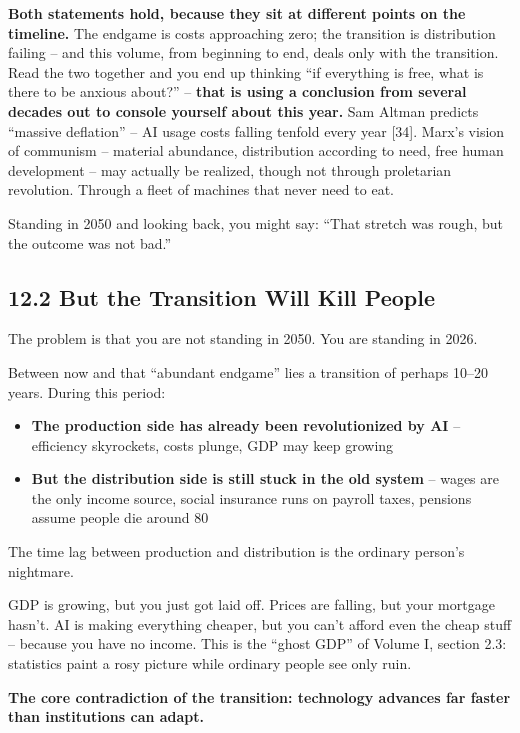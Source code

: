 \documentclass[11pt,a4paper]{article}
\begin{document}
\textbf{Both statements hold, because they sit at different points on the timeline.} The endgame is costs approaching zero; the transition is distribution failing -- and this volume, from beginning to end, deals only with the transition. Read the two together and you end up thinking ``if everything is free, what is there to be anxious about?'' -- \textbf{that is using a conclusion from several decades out to console yourself about this year.} Sam Altman predicts ``massive deflation'' -- AI usage costs falling tenfold every year [34]. Marx's vision of communism -- material abundance, distribution according to need, free human development -- may actually be realized, though not through proletarian revolution. Through a fleet of machines that never need to eat.

Standing in 2050 and looking back, you might say: ``That stretch was rough, but the outcome was not bad.''

\subsection{12.2 But the Transition Will Kill People}

The problem is that you are not standing in 2050. You are standing in 2026.

Between now and that ``abundant endgame'' lies a transition of perhaps 10--20 years. During this period:

\begin{itemize}
  \item \textbf{The production side has already been revolutionized by AI} -- efficiency skyrockets, costs plunge, GDP may keep growing
  \item \textbf{But the distribution side is still stuck in the old system} -- wages are the only income source, social insurance runs on payroll taxes, pensions assume people die around 80
\end{itemize}

The time lag between production and distribution is the ordinary person's nightmare.

GDP is growing, but you just got laid off. Prices are falling, but your mortgage hasn't. AI is making everything cheaper, but you can't afford even the cheap stuff -- because you have no income. This is the ``ghost GDP'' of Volume I, section 2.3: statistics paint a rosy picture while ordinary people see only ruin.

\textbf{The core contradiction of the transition: technology advances far faster than institutions can adapt.}
\end{document}
